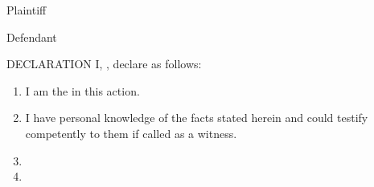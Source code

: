 \documentclass[12pt,letterpaper]{article}
\begin{document}
\thispagestyle{firstpage}

\begin{caseinfo}
\end{caseinfo}

\vspace{1em}

\begin{partyinfo}{Plaintiff}
\end{partyinfo}

\vspace{1em}

\begin{partyinfo}{Defendant}
\end{partyinfo}

\vspace{2em}

\begin{courtdocument}{DECLARATION}
I, \required, declare as follows:

\begin{enumerate}
    \item I am the  in this action.
    
    \item I have personal knowledge of the facts stated herein and could testify competently to them if called as a witness.
    
    \item {}
    
    \item {}
\end{enumerate}

\end{courtdocument}

\vspace{2em}

\begin{verification}
\end{verification}
\end{document}
